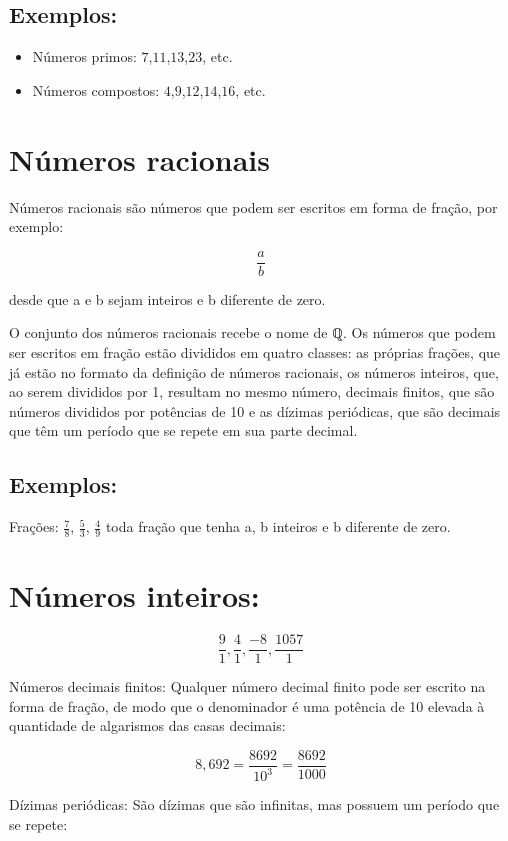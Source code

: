 \subsection{Exemplos:}

\begin{itemize}
\item Números primos: $7$,$11$,$13$,$23$, etc.
\item Números compostos: $4$,$9$,$12$,$14$,$16$, etc.
\end{itemize}

\section{Números racionais}

Números racionais são números que podem ser escritos em forma de fração,
por exemplo:

$$\frac{a}{b}$$

desde que a e b sejam inteiros e b diferente de zero.

O conjunto dos números racionais recebe o nome de ℚ. Os números que
podem ser escritos em fração estão divididos em quatro classes: as
próprias frações, que já estão no formato da definição de números
racionais, os números inteiros, que, ao serem divididos por 1, resultam
no mesmo número, decimais finitos, que são números divididos por
potências de 10 e as dízimas periódicas, que são decimais que têm um
período que se repete em sua parte decimal.

\subsection{Exemplos:}

Frações: $\frac{7}{8}$, $\frac{5}{3}$, $\frac{4}{9}$ toda fração que tenha a,
b inteiros e b diferente de zero.

\section{Números inteiros:}

 $$\frac{9}{1},  \frac{4}{1}, \frac{-8}{1},  \frac{1057}{1}$$

Números decimais finitos: Qualquer número decimal finito pode ser
escrito na forma de fração, de modo que o denominador é uma potência de
10 elevada à quantidade de algarismos das casas decimais:

$$8,692  = \frac{8692}{10^{3}} = \frac{8692}{1000}$$

Dízimas periódicas: São dízimas que são infinitas, mas possuem um
período que se repete: 

